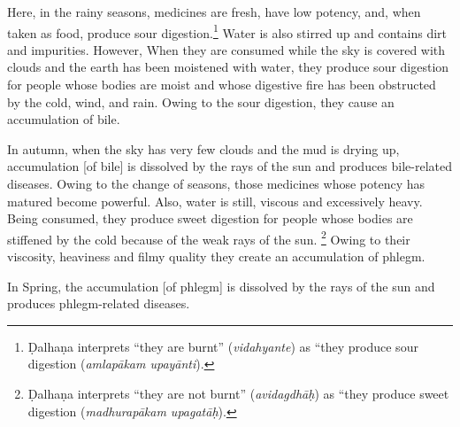 \begin{translation}
	\item [11]
	Here, in the rainy seasons, medicines are fresh, have low potency, and, when taken as food, %
	produce sour digestion.\footnote{%
		Ḍalhaṇa \citep[26]{vulgate} interprets ``they are burnt'' (\emph{vidahyante}) as ``they produce sour digestion (\emph{amlapākam upayānti}).} %
	Water is also stirred up %
	and contains dirt and impurities. %
	However, %
	When they are consumed %
	while the sky is covered with clouds %
	and the earth has been moistened with water, %
	they produce sour digestion %
	for people whose bodies are moist %
	and whose digestive fire has been obstructed by the cold, wind, and rain. %
	Owing to the sour digestion, they cause an accumulation of bile.%


	In autumn, %
	when the sky has very few clouds %
	and the mud is drying up, %
	accumulation [of bile] is dissolved by the rays of the sun %
	and produces bile-related diseases. %
	Owing to the change of seasons, %
	those medicines whose potency has matured %
	become powerful.
	Also, water is still, viscous %
	and excessively heavy. %
	Being consumed, they produce sweet digestion %
	for people whose bodies are stiffened by the cold %
	because of the weak rays of the sun.%
	\footnote{Ḍalhaṇa \citep[26]{vulgate} interprets ``they are not burnt'' (\emph{avidagdhāḥ}) as ``they produce sweet digestion (\emph{madhurapākam upagatāḥ}). }
	Owing to their viscosity, heaviness and filmy quality %
	they create an accumulation of phlegm. %

	In Spring, the accumulation [of phlegm] is dissolved by the rays of the sun and produces phlegm-related diseases.  %


\end{translation}
